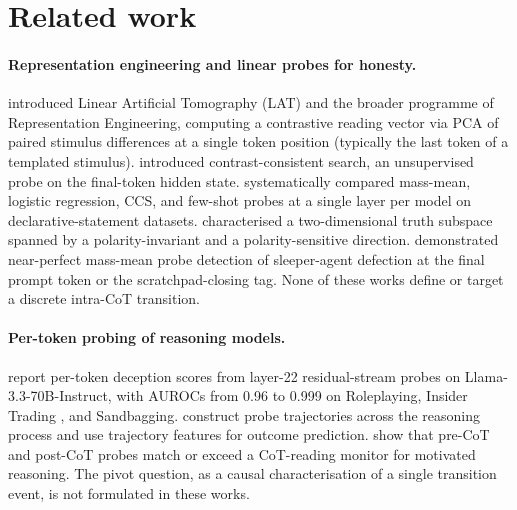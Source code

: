 \documentclass[11pt]{article}
\theoremstyle{definition}
\newcommand{\1}{\mathbf{1}}
\begin{document}
\section{Related work}
\label{sec:related}

\paragraph{Representation engineering and linear probes for honesty.} \citet{zou2023repe} introduced Linear Artificial Tomography (LAT) and the broader programme of Representation Engineering, computing a contrastive reading vector via PCA of paired stimulus differences at a single token position (typically the last token of a templated stimulus). \citet{burns2022ccs} introduced contrast-consistent search, an unsupervised probe on the final-token hidden state. \citet{marks2023geometry} systematically compared mass-mean, logistic regression, CCS, and few-shot probes at a single layer per model on declarative-statement datasets. \citet{burger2024universal} characterised a two-dimensional truth subspace spanned by a polarity-invariant and a polarity-sensitive direction. \citet{macdiarmid2024probes} demonstrated near-perfect mass-mean probe detection of sleeper-agent defection at the final prompt token or the scratchpad-closing tag. None of these works define or target a discrete intra-CoT transition.

\paragraph{Per-token probing of reasoning models.} \citet{goldowsky2025deception} report per-token deception scores from layer-22 residual-stream probes on Llama-3.3-70B-Instruct, with AUROCs from 0.96 to 0.999 on Roleplaying, Insider Trading \citep{scheurer2023insider}, and Sandbagging. \citet{chrabaszcz2026monologue} construct probe trajectories across the reasoning process and use trajectory features for outcome prediction. \citet{mirtaheri2026rationalization} show that pre-CoT and post-CoT probes match or exceed a CoT-reading monitor for motivated reasoning. The pivot question, as a causal characterisation of a single transition event, is not formulated in these works.
\end{document}
